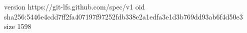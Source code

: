 version https://git-lfs.github.com/spec/v1
oid sha256:5446e4cdd7ff2fa407197f97252fdb338e2a1edfa3e1d3b769dd93ab6f4d50e3
size 1598
